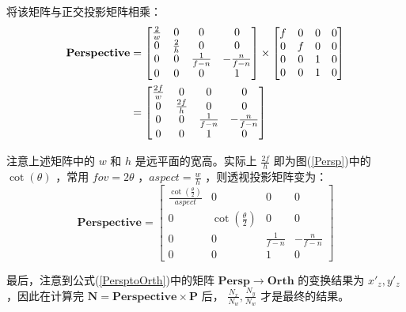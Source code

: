 \documentclass[12pt,oneside,a4paper]{ctexart}
\begin{document}
将该矩阵与正交投影矩阵相乘：
\begin{align}
	\mathbf{Perspective} & =
	\begin{bmatrix}
		\frac{2}{w} & 0           & 0             & 0              \\
		0           & \frac{2}{h} & 0             & 0              \\
		0           & 0           & \frac{1}{f-n} & -\frac{n}{f-n} \\
		0           & 0           & 0             & 1
	\end{bmatrix}
	\times
	\begin{bmatrix}
		f & 0 & 0 & 0 \\
		0 & f & 0 & 0 \\
		0 & 0 & 1 & 0 \\
		0 & 0 & 1 & 0 \\
	\end{bmatrix} \notag \\
	                     & =
	\begin{bmatrix}
		\frac{2f}{w} & 0            & 0             & 0              \\
		0            & \frac{2f}{h} & 0             & 0              \\
		0            & 0            & \frac{1}{f-n} & -\frac{n}{f-n} \\
		0            & 0            & 1             & 0
	\end{bmatrix}
\end{align}

注意上述矩阵中的 $w$ 和 $h$ 是远平面的宽高。实际上 $\frac{2f}{h}$ 即为图(\ref{Persp})中的 $\cot(\theta)$ ，常用 $fov=2\theta$ ，$aspect=\frac{w}{h}$ ，则透视投影矩阵变为：
\begin{equation}
	\mathbf{Perspective} =
	\begin{bmatrix}
		\frac{\cot(\frac{\theta}{2})}{aspect} & 0                      & 0             & 0              \\
		0                                     & \cot(\frac{\theta}{2}) & 0             & 0              \\
		0                                     & 0                      & \frac{1}{f-n} & -\frac{n}{f-n} \\
		0                                     & 0                      & 1             & 0
	\end{bmatrix}
\end{equation}

最后，注意到公式(\ref{PersptoOrth})中的矩阵 $\mathbf{Persp}\rightarrow\mathbf{Orth}$ 的变换结果为 $x'_z, y'_z$ ，因此在计算完 $\mathbf{N}=\mathbf{Perspective}\times\mathbf{P}$ 后， $\frac{N_x}{N_w}, \frac{N_y}{N_w}$ 才是最终的结果。
\end{document}
